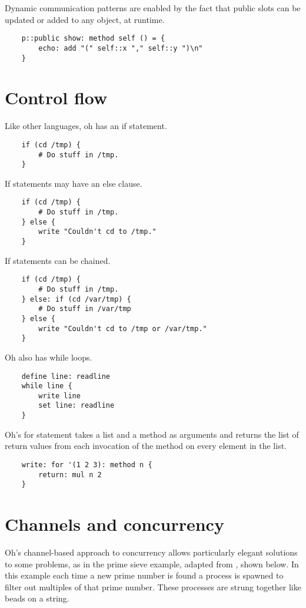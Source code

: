 \documentclass[12pt]{book}
\begin{document}
Dynamic communication patterns are enabled by the fact that public slots
can be updated or added to any object, at runtime.

\begin{lstlisting}
	p::public show: method self () = {
		echo: add "(" self::x "," self::y ")\n"
	}
\end{lstlisting}


\section{Control flow}

Like other languages, oh has an if statement.

\begin{lstlisting}
	if (cd /tmp) {
		# Do stuff in /tmp.
	}
\end{lstlisting}

If statements may have an else clause.

\begin{lstlisting}
	if (cd /tmp) {
		# Do stuff in /tmp.
	} else {
		write "Couldn't cd to /tmp."
	}
\end{lstlisting}

If statements can be chained.

\begin{lstlisting}
	if (cd /tmp) {
		# Do stuff in /tmp.
	} else: if (cd /var/tmp) {
		# Do stuff in /var/tmp
	} else {
		write "Couldn't cd to /tmp or /var/tmp."
	}
\end{lstlisting}

Oh also has while loops.

\begin{lstlisting}
	define line: readline
	while line {
		write line
		set line: readline
	}
\end{lstlisting}

Oh's for statement takes a list and a method as arguments and returns the
list of return values from each invocation of the method on every element
in the list.

\begin{lstlisting}
	write: for '(1 2 3): method n {
	    return: mul n 2
	}
\end{lstlisting}


\section{Channels and concurrency}

Oh's channel-based approach to concurrency allows particularly elegant
solutions to some problems, as in the prime sieve example, adapted
from \cite{NALfCwM}, shown below. In this example each time a new prime
number is found a process is spawned to filter out multiples of that
prime number. These processes are strung together like beads on a string.
\end{document}

